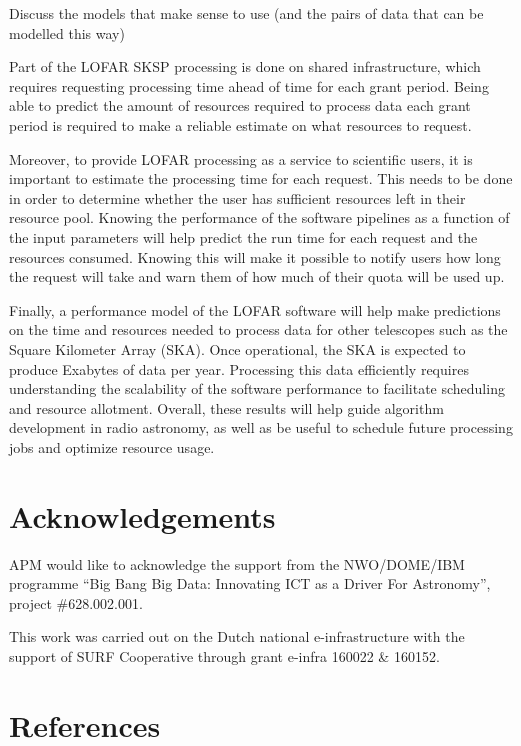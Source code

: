 \documentclass[preprint,5p]{elsarticle}
\begin{document}
Discuss the models that make sense to use (and the pairs of data that can be modelled this way) 


Part of the LOFAR SKSP processing is done on shared infrastructure, which requires requesting processing time ahead of time for each grant period. Being able to predict the amount of resources required to process data each grant period is required to make a reliable estimate on what resources to request.

Moreover, to provide LOFAR processing as a service to scientific users, it is important to estimate the processing time for each request. This needs to be done in order to determine whether the user has sufficient resources left in their resource pool. Knowing the performance of the software pipelines as a function of the input parameters will help predict the run time for each request and the resources consumed. Knowing this will make it possible to notify users how long the request will take and warn them of how much of their quota will be used up. 

Finally, a performance model of the LOFAR software will help make predictions on the time and resources needed to process data for other telescopes such as the Square Kilometer Array (SKA). Once operational, the SKA is expected to produce Exabytes of data per year. Processing this data efficiently requires understanding the scalability of the software performance to facilitate scheduling and resource allotment. Overall, these results will help guide algorithm development in radio astronomy, as well as be useful to schedule future processing jobs and optimize resource usage. 




\section*{Acknowledgements}
APM would like to acknowledge the support from the NWO/DOME/IBM programme ``Big Bang Big Data: Innovating ICT as a Driver For Astronomy'', project \#628.002.001.



This work was carried out on the Dutch national e-infrastructure with the support of SURF
Cooperative through grant e-infra 160022 \& 160152.

\section*{References}

\end{document}

